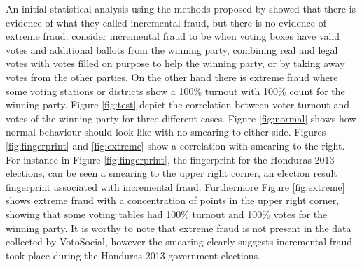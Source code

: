 \documentclass[letterpaper,10pt]{article}
\begin{document}
An initial statistical analysis using the methods proposed by \cite{klimek2012} showed that there is evidence of what they called incremental fraud, but there is no evidence of extreme fraud. \cite{klimek2012} consider incremental fraud to be when voting boxes have valid votes and additional ballots from the winning party, combining real and legal votes with votes filled on purpose to help the winning party, or by taking away votes from the other parties. On the other hand there is extreme fraud where some voting stations or districts show a 100\% turnout with 100\% count for the winning party. Figure \ref{fig:test} depict the correlation between voter turnout and votes of the winning party for three different cases. Figure \ref{fig:normal} shows how normal behaviour should look like with no smearing to either side. Figures \ref{fig:fingerprint} and \ref{fig:extreme} show a correlation with smearing to the right. For instance in Figure \ref{fig:fingerprint}, the fingerprint for the Honduras 2013 elections, can be seen a smearing to the upper right corner, an election result fingerprint associated with incremental fraud. Furthermore Figure \ref{fig:extreme} shows extreme fraud with a concentration of points in the upper right corner, showing that some voting tables had 100\% turnout and 100\% votes for the winning party. It is worthy to note that extreme fraud is not present in the data collected by VotoSocial, however the smearing clearly suggests incremental fraud took place during the Honduras 2013 government elections.

\end{document}

